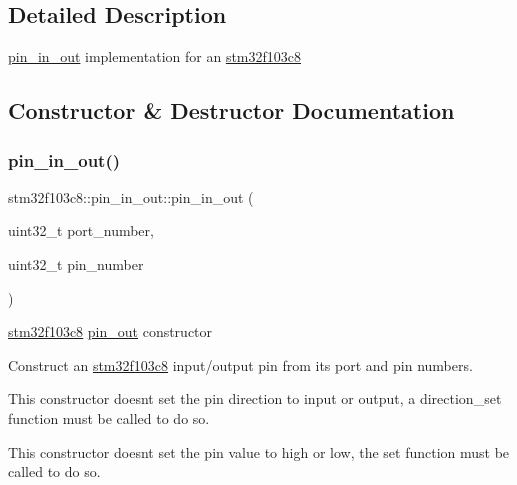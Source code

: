 \subsection{Detailed Description}
\hyperlink{classstm32f103c8_1_1pin__in__out}{pin\+\_\+in\+\_\+out} implementation for an \hyperlink{namespacestm32f103c8}{stm32f103c8} 

\subsection{Constructor \& Destructor Documentation}
\mbox{\label{classstm32f103c8_1_1pin__in__out_ae0be32694f4e9cdedf30d3e6b8514af9}} 
\subsubsection{\texorpdfstring{pin\+\_\+in\+\_\+out()}{pin\_in\_out()}\hspace{0.1cm}{\footnotesize\ttfamily [1/2]}}
{\footnotesize\ttfamily stm32f103c8\+::pin\+\_\+in\+\_\+out\+::pin\+\_\+in\+\_\+out (\begin{DoxyParamCaption}\item[{uint32\+\_\+t}]{port\+\_\+number,  }\item[{uint32\+\_\+t}]{pin\+\_\+number }\end{DoxyParamCaption})\hspace{0.3cm}{\ttfamily [inline]}}

\hyperlink{namespacestm32f103c8}{stm32f103c8} \hyperlink{classstm32f103c8_1_1pin__out}{pin\+\_\+out} constructor

Construct an \hyperlink{namespacestm32f103c8}{stm32f103c8} input/output pin from its port and pin numbers.

This constructor doesn\textquotesingle{}t set the pin direction to input or output, a direction\+\_\+set function must be called to do so.

This constructor doesn\textquotesingle{}t set the pin value to high or low, the set function must be called to do so. \mbox{\label{classstm32f103c8_1_1pin__in__out_a61988e52e555670c6ee886cb25f1bd82}} 
